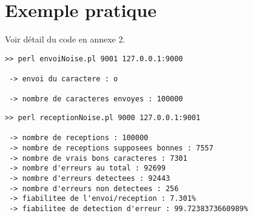     \section{Exemple pratique}
           \lstset{
                language=bash, basicstyle=\ttfamily\small, columns=flexible,
                tabsize=2, extendedchars=true, showspaces=false,
                showstringspaces=false, numbers=left, numberstyle=\tiny,
                breaklines=true, breakautoindent=true, captionpos=b
            }
Voir détail du code en annexe 2.
    \begin{lstlisting}
>> perl envoiNoise.pl 9001 127.0.0.1:9000

 -> envoi du caractere : o

 -> nombre de caracteres envoyes : 100000

    \end{lstlisting}

    \begin{lstlisting}
>> perl receptionNoise.pl 9000 127.0.0.1:9001

 -> nombre de receptions : 100000
 -> nombre de receptions supposees bonnes : 7557
 -> nombre de vrais bons caracteres : 7301
 -> nombre d'erreurs au total : 92699
 -> nombre d'erreurs detectees : 92443
 -> nombre d'erreurs non detectees : 256
 -> fiabilitee de l'envoi/reception : 7.301%
 -> fiabilitee de detection d'erreur : 99.7238373660989%

    \end{lstlisting}
